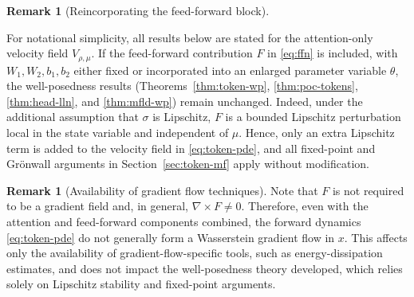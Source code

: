\documentclass[11pt,a4wide]{article}
\theoremstyle{definition}
\newtheorem{remark}[theorem]{Remark}
\begin{document}
\begin{remark}[Reincorporating the feed-forward block]
\label{rem:ffn}

For notational simplicity, all results below are stated for the attention-only
velocity field $V_{\rho,\mu}$. If the feed-forward contribution $F$ in
\eqref{eq:ffn} is included, with $W_1,W_2,b_1,b_2$ either fixed or incorporated
into an enlarged parameter variable $\theta$, the well-posedness results
(Theorems~\ref{thm:token-wp}, \ref{thm:poc-tokens}, \ref{thm:head-lln},
and \ref{thm:mfld-wp}) remain unchanged. Indeed, under the additional
assumption that $\sigma$ is Lipschitz, $F$ is a bounded Lipschitz perturbation
local in the state variable and independent of $\mu$. Hence, only
an extra Lipschitz term is added  to the velocity field in \eqref{eq:token-pde},
and all fixed-point and Gr\"onwall arguments in Section~\ref{sec:token-mf}
apply without modification.
\end{remark} 

\begin{remark}[Availability of gradient flow techniques]
Note that $F$ is not required to be a gradient field and, in general,
$\nabla\times F\neq0$. Therefore, even with the attention and feed-forward
components combined, the forward dynamics \eqref{eq:token-pde} do not generally
form a Wasserstein gradient flow in $x$. This affects only the availability of
gradient-flow-specific tools, such as energy-dissipation estimates, and does
not impact the well-posedness theory developed, which relies solely on
Lipschitz stability and fixed-point arguments. 
\end{remark}
\end{document}
